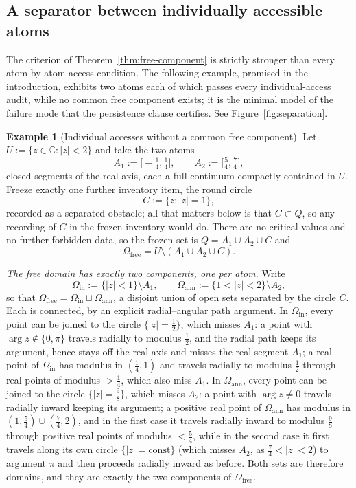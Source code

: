\documentclass[11pt,reqno]{amsart}
\theoremstyle{definition}
\newtheorem{example}[theorem]{Example}
\theoremstyle{remark}
\newcommand{\C}{\mathbb C}
\newcommand{\Omfree}{\Omega_{\mathrm{free}}}
\begin{document}
\subsection{A separator between individually accessible atoms}\label{subsec:D-example}

The criterion of Theorem~\ref{thm:free-component} is strictly stronger than every
atom-by-atom access condition. The following example, promised in the introduction,
exhibits two atoms each of which passes every individual-access audit, while no common
free component exists; it is the minimal model of the failure mode that the persistence
clause certifies. See Figure~\ref{fig:separation}.

\begin{example}[Individual accesses without a common free component]
\label{ex:no-common-component}
Let $U:=\{z\in\C:|z|<2\}$ and take the two atoms
\[
A_1:=\bigl[-\tfrac14,\tfrac14\bigr],
\qquad
A_2:=\bigl[\tfrac54,\tfrac74\bigr],
\]
closed segments of the real axis, each a full continuum compactly contained in $U$.
Freeze exactly one further inventory item, the round circle
\[
C:=\{z:|z|=1\},
\]
recorded as a separated obstacle; all that matters below is that $C\subset Q$, so any
recording of $C$ in the frozen inventory would do. There
are no critical values and no further forbidden data, so the frozen set is
$Q=A_1\cup A_2\cup C$ and
\[
\Omfree=U\setminus(A_1\cup A_2\cup C).
\]

\emph{The free domain has exactly two components, one per atom.} Write
\[
\Omega_{\mathrm{in}}:=\{|z|<1\}\setminus A_1,
\qquad
\Omega_{\mathrm{ann}}:=\{1<|z|<2\}\setminus A_2,
\]
so that $\Omfree=\Omega_{\mathrm{in}}\sqcup\Omega_{\mathrm{ann}}$, a disjoint union of
open sets separated by the circle $C$. Each is connected, by an explicit radial--angular
path argument. In $\Omega_{\mathrm{in}}$, every point can be joined to the circle
$\{|z|=\tfrac12\}$, which misses $A_1$: a point with $\arg z\notin\{0,\pi\}$ travels
radially to modulus $\tfrac12$, and the radial path keeps its argument, hence stays off
the real axis and misses the real segment $A_1$; a real point of
$\Omega_{\mathrm{in}}$ has modulus in $(\tfrac14,1)$ and travels radially to modulus
$\tfrac12$ through real points of modulus $>\tfrac14$, which also miss $A_1$. In
$\Omega_{\mathrm{ann}}$, every point can be joined to the circle $\{|z|=\tfrac98\}$,
which misses $A_2$: a point with $\arg z\neq0$ travels radially inward keeping its
argument; a positive real point of $\Omega_{\mathrm{ann}}$ has modulus in
$(1,\tfrac54)\cup(\tfrac74,2)$, and in the first case it travels radially inward to
modulus $\tfrac98$ through positive real points of modulus $<\tfrac54$, while in the
second case it first travels along its own circle $\{|z|=\mathrm{const}\}$ (which
misses $A_2$, as $\tfrac74<|z|<2$) to argument $\pi$ and then proceeds radially inward
as before. Both sets are
therefore domains, and they are exactly the two components of $\Omfree$.


\end{example}
\end{document}

